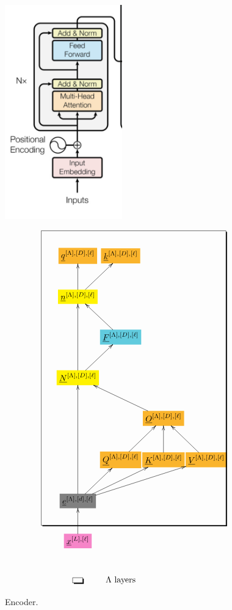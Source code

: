 \documentclass[12pt]{article}
\begin{document}
\begin{figure}[h!]\centering
\begin{minipage}{.5\linewidth}
\includegraphics[width=2in]{encoder.jpg}
\end{minipage}%
\begin{minipage}{.5\linewidth}
$$\xymatrix@R=2.5pc@C=0.1pc{
*+[F*:Dandelion]{\underline{q}^{[\Lambda],[D], [\ell]}}&*+[F*:Dandelion]{\underline{k}^{[\Lambda],[D], [\ell]}}&&
\\
*+[F*:yellow]{\underline{n}^{[\Lambda],[D], [\ell]}}\ar[ur]\ar[u]&&&
\\
&*+[F*:SkyBlue]{\underline{F}^{[\Lambda],[D], [\ell]}}\ar[ul]&&
\\
*+[F*:yellow]{\underline{N}^{[\Lambda],[D], [\ell]}}\ar[ur]\ar[uu]&&&
\\
&&*+[F*:Dandelion]{\underline{O}^{[\Lambda],[D], [\ell]}}\ar[ull]&
\\
&*+[F*:Dandelion]{\underline{Q}^{[\Lambda],[D], [\ell]}}\ar[ur]&*+[F*:Dandelion]{\underline{K}^{[\Lambda],[D], [\ell]}}\ar[u]&*+[F*:Dandelion]{\underline{V}^{[\Lambda],[D],[\ell]}}\ar[ul]
\\
*+[F*:gray]{\underline{e}^{[\Lambda],[d], [\ell]}}\ar[urr]\ar[uuu]\ar[ur]\ar[urrr]&&&
\\
*+[F*:Lavender]{\underline{x}^{[L],[\ell]}}\ar[u]&&&
\save
\POS"1,1"."7,1"."1,4"."7,4"!C*+<4.0em>\frm{-,}
\restore
\\
*+[F-,]{\;\;}&\text{$\Lambda$ layers}
}$$
\end{minipage}
\caption{Encoder.}
\label{fig-texnn-for-encoder}
\end{figure}
\end{document}
